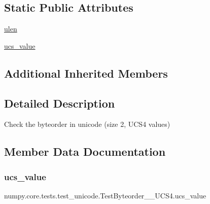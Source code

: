 \subsection*{Static Public Attributes}
\begin{DoxyCompactItemize}
\item 
\hyperlink{classnumpy_1_1core_1_1tests_1_1test__unicode_1_1TestByteorder__2__UCS4_acac1d585a240988906d1e5cdb93ac9cb}{ulen}
\item 
\hyperlink{classnumpy_1_1core_1_1tests_1_1test__unicode_1_1TestByteorder__2__UCS4_a1cffceab097896d6edfd1fa5b93f34bd}{ucs\+\_\+value}
\end{DoxyCompactItemize}
\subsection*{Additional Inherited Members}


\subsection{Detailed Description}
\begin{DoxyVerb}Check the byteorder in unicode (size 2, UCS4 values)\end{DoxyVerb}
 

\subsection{Member Data Documentation}
\mbox{\label{classnumpy_1_1core_1_1tests_1_1test__unicode_1_1TestByteorder__2__UCS4_a1cffceab097896d6edfd1fa5b93f34bd}} 
\subsubsection{\texorpdfstring{ucs\+\_\+value}{ucs\_value}}
{\footnotesize\ttfamily numpy.\+core.\+tests.\+test\+\_\+unicode.\+Test\+Byteorder\+\_\+\_\+\+U\+C\+S4.\+ucs\+\_\+value\hspace{0.3cm}{\ttfamily [static]}}

